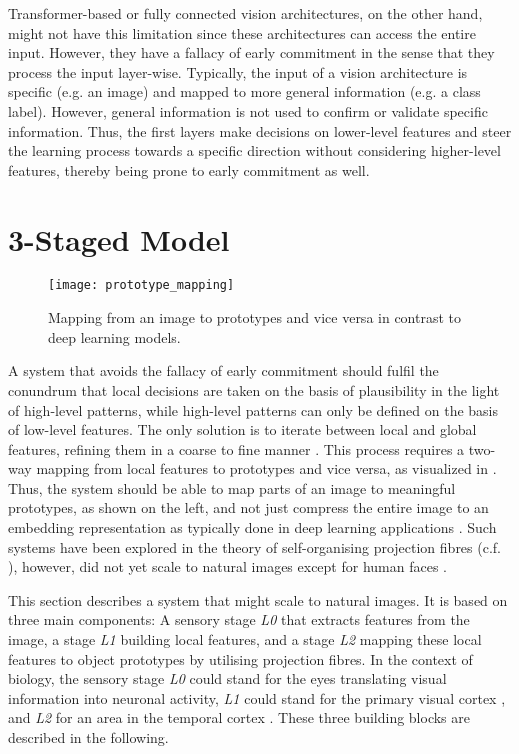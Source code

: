 Transformer-based  or fully connected  vision architectures, on the other hand, might not have this limitation since these architectures can access the entire input.
However, they have a fallacy of early commitment in the sense that they process the input layer-wise. Typically, the input of a vision architecture is specific (e.g. an image) and mapped to more general information (e.g. a class label).
However, general information is not used to confirm or validate specific information.
Thus, the first layers make decisions on lower-level features and steer the learning process towards a specific direction without considering higher-level features, thereby being prone to early commitment as well.


\section{3-Staged Model}
\begin{figure}[h]
    \centering
    \texttt{[image: prototype\_mapping]}
    \caption[Mapping from an image to prototypes]{Mapping from an image to prototypes and vice versa in contrast to deep learning models.}
\end{figure}

A system that avoids the fallacy of early commitment should fulfil the conundrum that local decisions are taken on the basis of plausibility in the light of high-level patterns, while high-level patterns can only be defined on the basis of low-level features.
The only solution is to iterate between local and global features, refining them in a coarse to fine manner . This process requires a two-way mapping from local features to prototypes and vice versa, as visualized in .
Thus, the system should be able to map parts of an image to meaningful prototypes, as shown on the left, and not just compress the entire image to an embedding representation as typically done in deep learning applications .
Such systems have been explored in the theory of self-organising projection fibres (c.f. ), however, did not yet scale to natural images except for human faces \cite{wolfrum_recurrent_2008}.

This section describes a system that might scale to natural images.
It is based on three main components: A sensory stage \emph{L0} that extracts features from the image, a stage \emph{L1} building local features, and a stage \emph{L2} mapping these local features to object prototypes by utilising projection fibres.
In the context of biology, the sensory stage \emph{L0} could stand for the eyes translating visual information into neuronal activity, \emph{L1} could stand for the primary visual cortex , and \emph{L2} for an area in the temporal cortex .
These three building blocks are described in the following.

